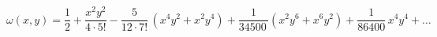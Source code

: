 \begin{equation}\label{omeg}
\omega (x,y)= \frac{1}{2} + \frac{x^{2}y^{2}}{4\cdot5!} -
\frac{5}{12\cdot7!}\,(x^{4}y^{2} +x^{2}y^{4})
 + \frac{1}{34500\,}(x^{2}y^{6} + x^{6}y^{2}) +
\frac{1}{86400}\,x^{4}y^{4} + \ldots
\end{equation}

